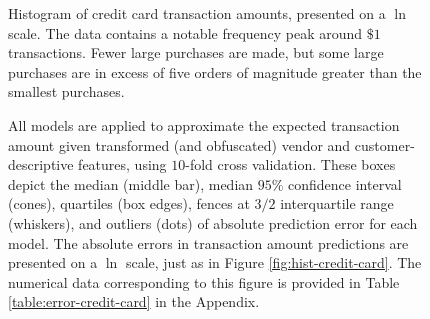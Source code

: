 \documentclass[smallextended,final]{svjour3}  %
\begin{document}
\begin{figure}
  \centering
  \caption{Histogram of credit card transaction amounts, presented on
    a $\ln$ scale. The data contains a notable frequency peak around
    $\$1$ transactions. Fewer large purchases are made, but some large
    purchases are in excess of five orders of magnitude greater than
    the smallest purchases.}
  \label{fig:hist-credit-card}

  \vspace{.3cm}

  \caption{All models are applied to approximate the expected
    transaction amount given transformed (and obfuscated) vendor and
    customer-descriptive features, using $10$-fold cross validation.
    These boxes depict the median (middle bar), median $95\%$
    confidence interval (cones), quartiles (box edges), fences at
    $3/2$ interquartile range (whiskers), and outliers (dots) of
    absolute prediction error for each model. The absolute errors in
    transaction amount predictions are presented on a $\ln$ scale,
    just as in Figure \ref{fig:hist-credit-card}. The numerical data
    corresponding to this figure is provided in Table
    \ref{table:error-credit-card} in the Appendix.}
  \label{fig:error-credit-card}
\end{figure}
\end{document}
